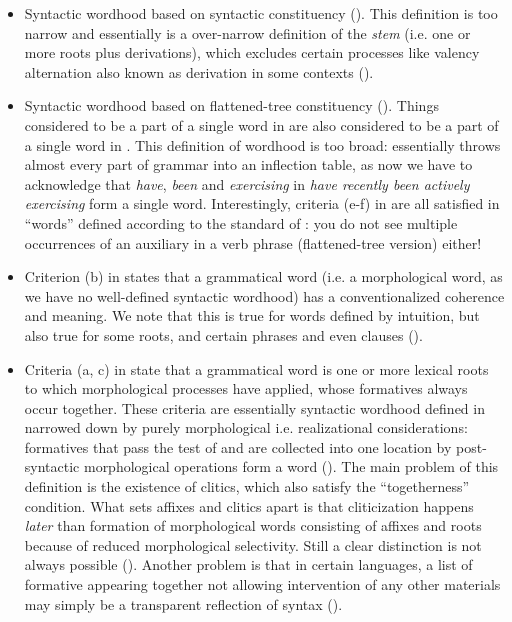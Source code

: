\documentclass[a4paper, oneside, scheme=plain, 12pt]{article}
\newcommand*{\citepage}[1]{p.~{#1}}
\newcommand*{\citepages}[1]{pp.~{#1}}
\newcommand*{\term}[1]{\emph{#1}}
\newcommand{\form}[1]{\emph{#1}}
\begin{document}
\begin{itemize}
    \item Syntactic wordhood based on syntactic constituency ().
    This definition is too narrow and essentially is a over-narrow definition of the \term{stem}
    (i.e. one or more roots plus derivations),
    which excludes certain processes like valency alternation also known as derivation in some contexts
    ().

    \item Syntactic wordhood based on flattened-tree constituency ().
    Things considered to be a part of a single word in 
    are also considered to be a part of a single word in .
    This definition of wordhood is too broad:
    essentially throws almost every part of grammar into an inflection table,
    as now we have to acknowledge that \form{have}, \form{been} and \form{exercising} in \form{have recently been actively exercising} form a single word.
    Interestingly, criteria (e-f) in \citet[\citepages{15-16}]{dixon2010basic2} are all satisfied in ``words'' defined according to the standard of :
    you do not see multiple occurrences of an auxiliary in a verb phrase (flattened-tree version) either!

    \item Criterion (b) in \citet[\citepage{13}]{dixon2010basic2} states that a grammatical word  (i.e. a morphological word, as we have no well-defined syntactic wordhood)
    has a conventionalized coherence and meaning.
    We note that this is true for words defined by intuition,
    but also true for some roots, and certain phrases and even clauses
    ().

    \item Criteria (a, c) in \citet[\citepages{13-16}]{dixon2010basic2} state that 
    a grammatical word is one or more lexical roots to which morphological processes have applied,
    whose formatives always occur together.
    These criteria are essentially syntactic wordhood defined in 
    narrowed down by purely morphological i.e. realizational considerations:
    formatives that pass the test of  
    and are collected into one location by post-syntactic morphological operations
    form a word ().
    The main problem of this definition is the existence of clitics,
    which also satisfy the ``togetherness'' condition.
    What sets affixes and clitics apart is that cliticization happens \emph{later} than formation of morphological words consisting of affixes and roots
    because of reduced morphological selectivity.
    Still a clear distinction is not always possible ().
    Another problem is that in certain languages,
    a list of formative appearing together not allowing intervention of any other materials
    may simply be a transparent reflection of syntax ().
    

\end{itemize}
\end{document}
